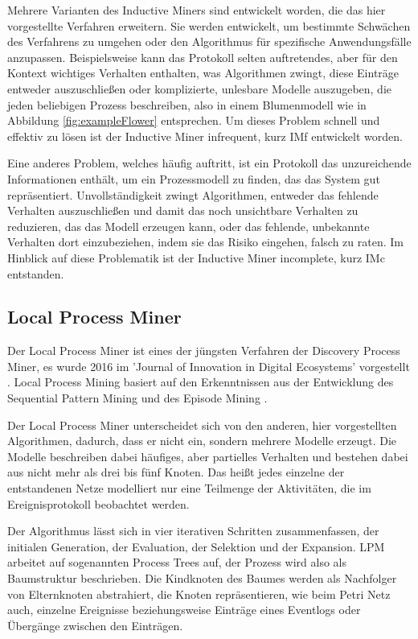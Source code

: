 Mehrere Varianten des Inductive Miners sind entwickelt worden, die das hier vorgestellte Verfahren erweitern. Sie werden entwickelt, um bestimmte Schwächen des Verfahrens zu umgehen oder den Algorithmus für spezifische Anwendungsfälle anzupassen. 
Beispielsweise kann das Protokoll selten auftretendes, aber für den Kontext wichtiges Verhalten enthalten, was Algorithmen zwingt, diese Einträge entweder auszuschließen oder komplizierte, unlesbare Modelle auszugeben, die jeden beliebigen Prozess beschreiben, also in einem  Blumenmodell wie in Abbildung \ref{fig:exampleFlower} entsprechen. Um dieses Problem schnell und effektiv zu lösen ist der Inductive Miner infrequent, kurz IMf\cite{inducFMining} entwickelt worden.

Eine anderes Problem, welches häufig auftritt, ist ein Protokoll das unzureichende Informationen enthält, um ein Prozessmodell zu finden, das das System gut repräsentiert. Unvollständigkeit zwingt Algorithmen, entweder das fehlende Verhalten auszuschließen und damit das noch unsichtbare Verhalten zu reduzieren, das das Modell erzeugen kann, oder das fehlende, unbekannte Verhalten dort einzubeziehen, indem sie das Risiko eingehen, falsch zu raten. Im Hinblick auf diese Problematik ist der Inductive Miner incomplete, kurz IMc \cite{inducIMining} entstanden.

\subsection{Local Process Miner}
Der Local Process Miner ist eines der jüngsten Verfahren der Discovery Process Miner, es wurde 2016 im 'Journal of Innovation in Digital Ecosystems' vorgestellt \cite{localMining}. Local Process Mining basiert auf den Erkenntnissen aus der Entwicklung des Sequential Pattern Mining\cite{Srikant1996MiningSP} und des Episode Mining \cite{mannila1997discovery}.

Der Local Process Miner unterscheidet sich von den anderen, hier vorgestellten Algorithmen, dadurch, dass er nicht ein, sondern mehrere Modelle erzeugt. Die Modelle beschreiben dabei häufiges, aber partielles Verhalten und bestehen dabei aus nicht mehr als drei bis fünf Knoten. Das heißt jedes einzelne der entstandenen Netze modelliert nur eine Teilmenge der Aktivitäten, die im Ereignisprotokoll beobachtet werden. 

Der Algorithmus lässt sich in vier iterativen Schritten zusammenfassen, der initialen Generation, der Evaluation, der Selektion und der Expansion. LPM arbeitet auf sogenannten Process Trees auf, der Prozess wird also als Baumstruktur beschrieben. Die  Kindknoten des Baumes werden als Nachfolger von Elternknoten abstrahiert, die Knoten repräsentieren, wie beim Petri Netz auch, einzelne Ereignisse beziehungsweise Einträge eines Eventlogs oder Übergänge zwischen den Einträgen. 


